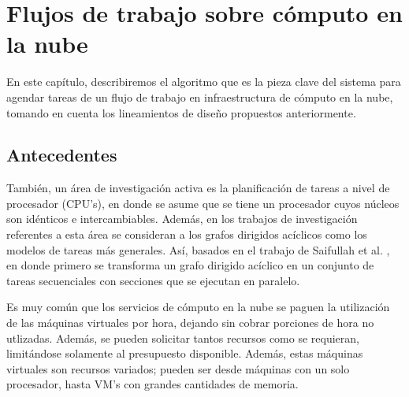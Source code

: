 \chapter{Flujos de trabajo sobre cómputo en la nube}

En este capítulo, describiremos el algoritmo que es la pieza clave del sistema para agendar tareas de un flujo de trabajo en infraestructura de cómputo en la nube, tomando en cuenta los lineamientos de diseño propuestos anteriormente.



\section{Antecedentes}

También, un área de investigación activa es la planificación de tareas a nivel de procesador (CPU's), en donde se asume que se tiene un procesador cuyos núcleos son idénticos e intercambiables. Además, en los trabajos de investigación referentes a esta área se consideran a los grafos dirigidos acíclicos como los modelos de tareas más generales. Así, basados en el trabajo de Saifullah et al. \cite{saifullah2013multi}, en donde primero se transforma un grafo dirigido acíclico en un conjunto de tareas secuenciales con secciones que se ejecutan en paralelo.









Es muy común que los servicios de cómputo en la nube se paguen la utilización de las máquinas virtuales por hora, dejando sin cobrar porciones de hora no utlizadas. Además, se pueden solicitar tantos recursos como se requieran, limitándose solamente al presupuesto disponible. Además, estas máquinas virtuales son recursos variados; pueden ser desde máquinas con un solo procesador, hasta VM's con grandes cantidades de memoria.

